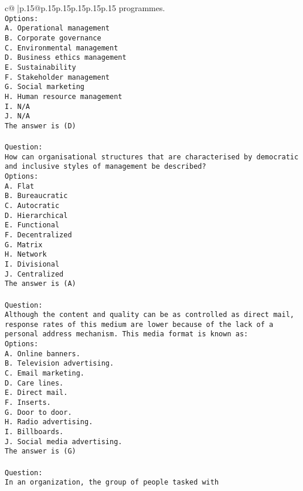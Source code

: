 \documentclass{article}
\begin{document}
{\begin{supertabular}{c@{$\;$}|p{.15\linewidth}@{}p{.15\linewidth}p{.15\linewidth}p{.15\linewidth}p{.15\linewidth}p{.15\linewidth}}
{{{programmes.\\ \tt Options:\\ \tt A. Operational management\\ \tt B. Corporate governance\\ \tt C. Environmental management\\ \tt D. Business ethics management\\ \tt E. Sustainability\\ \tt F. Stakeholder management\\ \tt G. Social marketing\\ \tt H. Human resource management\\ \tt I. N/A\\ \tt J. N/A\\ \tt The answer is (D)\\ \tt \\ \tt Question:\\ \tt How can organisational structures that are characterised by democratic and inclusive styles of management be described?\\ \tt Options:\\ \tt A. Flat\\ \tt B. Bureaucratic\\ \tt C. Autocratic\\ \tt D. Hierarchical\\ \tt E. Functional\\ \tt F. Decentralized\\ \tt G. Matrix\\ \tt H. Network\\ \tt I. Divisional\\ \tt J. Centralized\\ \tt The answer is (A)\\ \tt \\ \tt Question:\\ \tt Although the content and quality can be as controlled as direct mail, response rates of this medium are lower because of the lack of a personal address mechanism. This media format is known as:\\ \tt Options:\\ \tt A. Online banners.\\ \tt B. Television advertising.\\ \tt C. Email marketing.\\ \tt D. Care lines.\\ \tt E. Direct mail.\\ \tt F. Inserts.\\ \tt G. Door to door.\\ \tt H. Radio advertising.\\ \tt I. Billboards.\\ \tt J. Social media advertising.\\ \tt The answer is (G)\\ \tt \\ \tt Question:\\ \tt In an organization, the group of people tasked with }}}
\end{supertabular}}
\end{document}
